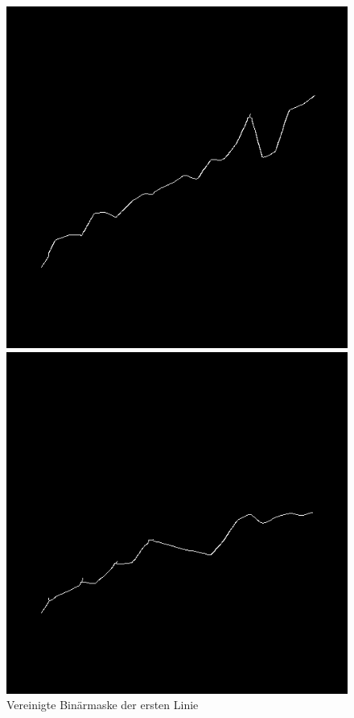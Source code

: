 \begin{figure}[h!] %
    \centering
    \begin{minipage}{0.315\textwidth} %
        \centering
        \includegraphics[width=\linewidth]{Implementation/img/alg_layer1_processed.png}
        \caption{ Vereinigte Binärmaske der ersten Linie}
        \label{fig:alg_layer1_processed}
    \end{minipage}\hfill %
    \begin{minipage}{0.315\textwidth} %
        \centering
        \includegraphics[width=\linewidth]{Implementation/img/alg_layer2_processed.png}

\end{minipage}
\end{figure}
